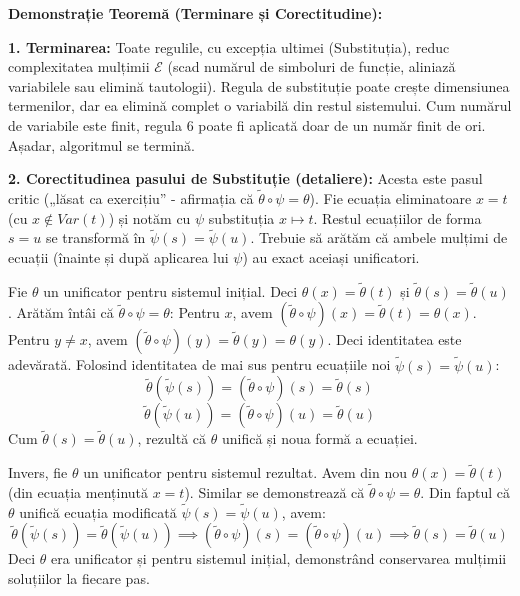 \textbf{Demonstrație Teoremă (Terminare și Corectitudine):}

\textbf{1. Terminarea:}
Toate regulile, cu excepția ultimei (Substituția), reduc complexitatea mulțimii $\mathcal{E}$ (scad numărul de simboluri de funcție, aliniază variabilele sau elimină tautologii). Regula de substituție poate crește dimensiunea termenilor, dar ea elimină complet o variabilă din restul sistemului. Cum numărul de variabile este finit, regula 6 poate fi aplicată doar de un număr finit de ori. Așadar, algoritmul se termină.

\textbf{2. Corectitudinea pasului de Substituție (detaliere):}
Acesta este pasul critic („lăsat ca exercițiu” - afirmația că $\tilde{\theta} \circ \psi = \theta$).
Fie ecuația eliminatoare $x=t$ (cu $x \notin Var(t)$) și notăm cu $\psi$ substituția $x \mapsto t$. Restul ecuațiilor de forma $s=u$ se transformă în $\tilde{\psi}(s) = \tilde{\psi}(u)$. Trebuie să arătăm că ambele mulțimi de ecuații (înainte și după aplicarea lui $\psi$) au exact aceiași unificatori.

Fie $\theta$ un unificator pentru sistemul inițial. Deci $\theta(x) = \tilde{\theta}(t)$ și $\tilde{\theta}(s) = \tilde{\theta}(u)$.
Arătăm întâi că $\tilde{\theta} \circ \psi = \theta$:
Pentru $x$, avem $(\tilde{\theta} \circ \psi)(x) = \tilde{\theta}(t) = \theta(x)$.
Pentru $y \neq x$, avem $(\tilde{\theta} \circ \psi)(y) = \tilde{\theta}(y) = \theta(y)$.
Deci identitatea este adevărată.
Folosind identitatea de mai sus pentru ecuațiile noi $\tilde{\psi}(s) = \tilde{\psi}(u)$:
$$\tilde{\theta}(\tilde{\psi}(s)) = (\tilde{\theta} \circ \psi)(s) = \tilde{\theta}(s)$$
$$\tilde{\theta}(\tilde{\psi}(u)) = (\tilde{\theta} \circ \psi)(u) = \tilde{\theta}(u)$$
Cum $\tilde{\theta}(s) = \tilde{\theta}(u)$, rezultă că $\theta$ unifică și noua formă a ecuației.

Invers, fie $\theta$ un unificator pentru sistemul rezultat. Avem din nou $\theta(x) = \tilde{\theta}(t)$ (din ecuația menținută $x=t$). Similar se demonstrează că $\tilde{\theta} \circ \psi = \theta$.
Din faptul că $\theta$ unifică ecuația modificată $\tilde{\psi}(s) = \tilde{\psi}(u)$, avem:
$$\tilde{\theta}(\tilde{\psi}(s)) = \tilde{\theta}(\tilde{\psi}(u)) \implies (\tilde{\theta} \circ \psi)(s) = (\tilde{\theta} \circ \psi)(u) \implies \tilde{\theta}(s) = \tilde{\theta}(u)$$
Deci $\theta$ era unificator și pentru sistemul inițial, demonstrând conservarea mulțimii soluțiilor la fiecare pas.
